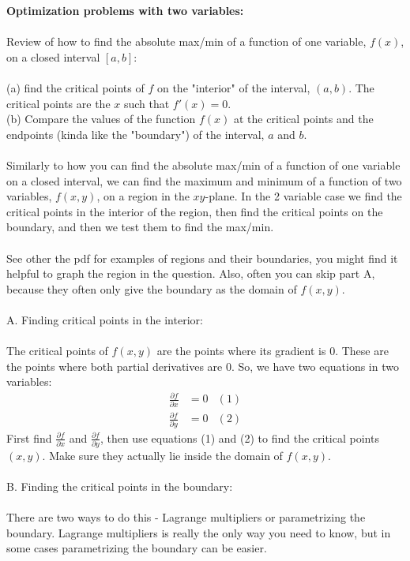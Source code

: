 \documentclass{article}
\begin{document}
\noindent \textbf{Optimization problems with two variables:} \\ \\
\noindent Review of how to find the absolute max/min of a function of one variable, $f(x)$, on a closed interval $[a,b]$: \\ \\
(a) find the critical points of $f$ on the "interior" of the interval, $(a,b)$. The critical points are the $x$ such that $f'(x) = 0$. \\ 
(b) Compare the values of the function $f(x)$ at the critical points and the endpoints (kinda like the "boundary") of the interval, $a$ and $b$.
\\ \\
\noindent Similarly to how you can find the absolute max/min of a function of one variable on a closed interval, we can find the maximum and minimum of a function of two variables, $f(x,y)$, on a region in the $xy$-plane. In the 2 variable case we find the critical points in the interior of the region, then find the critical points on the boundary, and then we test them to find the max/min. \\ \\
See other the pdf for examples of regions and their boundaries, you might find it helpful to graph the region in the question. Also, often you can skip part A, because they often only give the boundary as the domain of $f(x,y)$. \\ \\
A. Finding critical points in the interior: \\ \\
The critical points of $f(x,y)$ are the points where its gradient is 0. These are the points where both partial derivatives are 0. So, we have two equations in two variables:
\begin{align*}
    \frac{\partial f}{\partial x} &= 0 &(1) \\
    \frac{\partial f}{\partial y} &= 0 &(2)
\end{align*}
First find $\frac{\partial f}{\partial x}$ and $\frac{\partial f}{\partial y}$, then use equations (1) and (2) to find the critical points $(x,y)$. Make sure they actually lie inside the domain of $f(x,y)$. \\ \\
B. Finding the critical points in the boundary: \\ \\
There are two ways to do this - Lagrange multipliers or parametrizing the boundary. Lagrange multipliers is really the only way you need to know, but in some cases parametrizing the boundary can be easier. \\ \\
\end{document}
